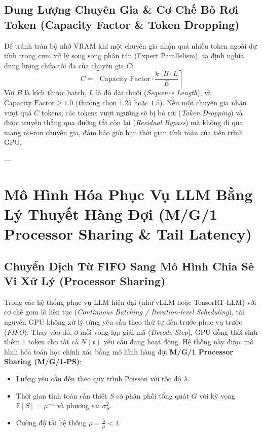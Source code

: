 \subsection{Dung Lượng Chuyên Gia \& Cơ Chế Bỏ Rơi Token (Capacity Factor \& Token Dropping)}
Để tránh tràn bộ nhớ VRAM khi một chuyên gia nhận quá nhiều token ngoài dự tính trong cụm xử lý song song phân tán (Expert Parallelism), ta định nghĩa dung lượng chứa tối đa của chuyên gia $C$:
\begin{equation}
C = \left\lceil \text{Capacity Factor} \cdot \frac{k \cdot B \cdot L}{E} \right\rceil
\end{equation}
Với $B$ là kích thước batch, $L$ là độ dài chuỗi (\textit{Sequence Length}), và $\text{Capacity Factor} \ge 1.0$ (thường chọn $1.25$ hoặc $1.5$).
Nếu một chuyên gia nhận vượt quá $C$ tokens, các tokens vượt ngưỡng sẽ bị bỏ rơi (\textit{Token Dropping}) và được truyền thẳng qua đường tắt còn lại (\textit{Residual Bypass}) mà không đi qua mạng nơ-ron chuyên gia, đảm bảo giới hạn thời gian tính toán của tiến trình GPU.

---

\section{Mô Hình Hóa Phục Vụ LLM Bằng Lý Thuyết Hàng Đợi (M/G/1 Processor Sharing \& Tail Latency)}
\label{sec:app-math-queueing-theory-llm}

\subsection{Chuyển Dịch Từ FIFO Sang Mô Hình Chia Sẻ Vi Xử Lý (Processor Sharing)}
Trong các hệ thống phục vụ LLM hiện đại (như vLLM hoặc TensorRT-LLM) với cơ chế gom lô liên tục (\textit{Continuous Batching / Iteration-level Scheduling}), tài nguyên GPU không xử lý từng yêu cầu theo thứ tự đến trước phục vụ trước (\textit{FIFO}). Thay vào đó, ở mỗi vòng lặp giải mã (\textit{Decode Step}), GPU đồng thời sinh thêm 1 token cho tất cả $N(t)$ yêu cầu đang hoạt động.
Hệ thống này được mô hình hóa toán học chính xác bằng mô hình hàng đợi \textbf{M/G/1 Processor Sharing (M/G/1-PS)}:
\begin{itemize}
  \item Luồng yêu cầu đến theo quy trình Poisson với tốc độ $\lambda$.
  \item Thời gian tính toán cần thiết $S$ có phân phối tổng quát $G$ với kỳ vọng $\mathbb{E}[S] = \mu^{-1}$ và phương sai $\sigma_S^2$.
  \item Cường độ tải hệ thống $\rho = \frac{\lambda}{\mu} < 1$.
\end{itemize}


